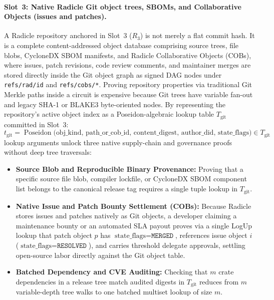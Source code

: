 \documentclass[a4paper,11pt,twoside,parskip=half-,headings=small]{scrartcl}
\newcommand{\code}[1]{\texttt{#1}}
\begin{document}
\paragraph{Slot~3: Native Radicle Git object trees, SBOMs, and Collaborative Objects (issues and patches).}
A Radicle repository anchored in Slot~3 ($R_3$) is not merely a flat commit hash. It is a complete content-addressed object database comprising source trees, file blobs, CycloneDX SBOM manifests, and Radicle Collaborative Objects (COBs), where issues, patch revisions, code review comments, and maintainer merges are stored directly inside the Git object graph as signed DAG nodes under \code{refs/rad/id} and \code{refs/cobs/*}. Proving repository properties via traditional Git Merkle paths inside a circuit is expensive because Git trees have variable fan-out and legacy SHA-1 or BLAKE3 byte-oriented nodes. By representing the repository's active object index as a Poseidon-algebraic lookup table $T_{\text{git}}$ committed in Slot~3:
\begin{equation}
  t_{\text{git}} = \operatorname{Poseidon}\bigl(\text{obj\_kind},\, \text{path\_or\_cob\_id},\, \text{content\_digest},\, \text{author\_did},\, \text{state\_flags}\bigr) \in T_{\text{git}}
\end{equation}
lookup arguments unlock three native supply-chain and governance proofs without deep tree traversals:
\begin{itemize}[nosep]
  \item \textbf{Source Blob and Reproducible Binary Provenance:} Proving that a specific source file blob, compiler lockfile, or CycloneDX SBOM component list belongs to the canonical release tag requires a single tuple lookup in $T_{\text{git}}$.
  \item \textbf{Native Issue and Patch Bounty Settlement (COBs):} Because Radicle stores issues and patches natively as Git objects, a developer claiming a maintenance bounty or an automated SLA payout proves via a single LogUp lookup that patch object $p$ has $\text{state\_flags} = \code{MERGED}$, references issue object $i$ ($\text{state\_flags} = \code{RESOLVED}$), and carries threshold delegate approvals, settling open-source labor directly against the Git object table.
  \item \textbf{Batched Dependency and CVE Auditing:} Checking that $m$ crate dependencies in a release tree match audited digests in $T_{\text{git}}$ reduces from $m$ variable-depth tree walks to one batched multiset lookup of size $m$.
\end{itemize}
\end{document}
